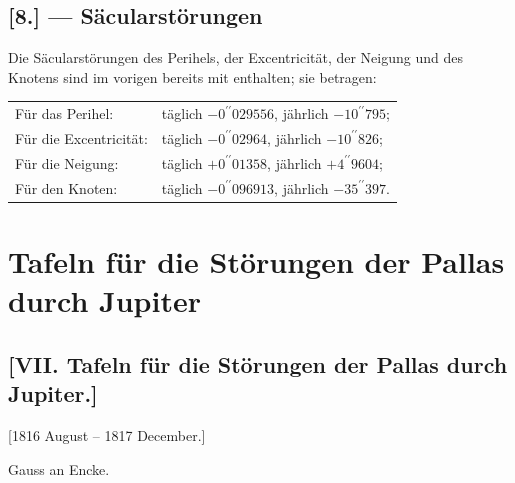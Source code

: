 \documentclass[10pt,a4paper]{article}
\begin{document}
\newpage
\subsection*{[8.] --- Säcularstörungen}

Die Säcularstörungen des Perihels, der Excentricität, der Neigung und des Knotens sind im vorigen 
 bereits mit enthalten; sie betragen:

\begin{center}
\begin{tabular}{ll}
Für das Perihel: & täglich $-0^{\prime\prime}029556$, jährlich $-10^{\prime\prime}795$; \\
Für die Excentricität: & täglich $-0^{\prime\prime}02964$, jährlich $-10^{\prime\prime}826$; \\
Für die Neigung: & täglich $+0^{\prime\prime}01358$, jährlich $+4^{\prime\prime}9604$; \\
Für den Knoten: & täglich $-0^{\prime\prime}096913$, jährlich $-35^{\prime\prime}397$.
\end{tabular}
\end{center}

\newpage
\section*{Tafeln für die Störungen der Pallas durch Jupiter}

\subsection*{[VII. Tafeln für die Störungen der Pallas durch Jupiter.]}

[1816 August -- 1817 December.]

Gauss an Encke.
\end{document}
